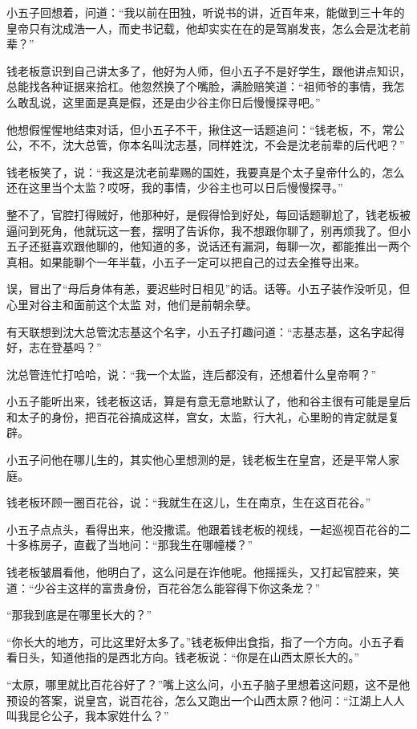 小五子回想着，问道：“我以前在田独，听说书的讲，近百年来，能做到三十年的皇帝只有沈成浩一人，而史书记载，他却实实在在的是驾崩发丧，怎么会是沈老前辈？”

钱老板意识到自己讲太多了，他好为人师，但小五子不是好学生，跟他讲点知识，总能找各种证据来拾杠。他忽然换了个嘴脸，满脸赔笑道：“祖师爷的事情，我怎么敢乱说，这里面是真是假，还是由少谷主你日后慢慢探寻吧。”

他想假惺惺地结束对话，但小五子不干，揪住这一话题追问：“钱老板，不，常公公，不不，沈大总管，你本名叫沈志基，同样姓沈，不会是沈老前辈的后代吧？”

钱老板笑了，说：“我这是沈老前辈赐的国姓，我要真是个太子皇帝什么的，怎么还在这里当个太监？哎呀，我的事情，少谷主也可以日后慢慢探寻。”

整不了，官腔打得贼好，他那种好，是假得恰到好处，每回话题聊尬了，钱老板被逼问到死角，他就玩这一套，摆明了告诉你，我不想跟你聊了，别再烦我了。但小五子还挺喜欢跟他聊的，他知道的多，说话还有漏洞，每聊一次，都能推出一两个真相。如果能聊个一年半载，小五子一定可以把自己的过去全推导出来。

误，冒出了“母后身体有恙，要迟些时日相见”的话。话等。小五子装作没听见，但心里对谷主和面前这个太监
对，他们是前朝余孽。

有天联想到沈大总管沈志基这个名字，小五子打趣问道：“志基志基，这名字起得好，志在登基吗？”

沈总管连忙打哈哈，说：“我一个太监，连后都没有，还想着什么皇帝啊？”

小五子能听出来，钱老板这话，算是有意无意地默认了，他和谷主很有可能是皇后和太子的身份，把百花谷搞成这样，宫女，太监，行大礼，心里盼的肯定就是复辟。

小五子问他在哪儿生的，其实他心里想测的是，钱老板生在皇宫，还是平常人家庭。

钱老板环顾一圈百花谷，说：“我就生在这儿，生在南京，生在这百花谷。”

小五子点点头，看得出来，他没撒谎。他跟着钱老板的视线，一起巡视百花谷的二十多栋房子，直截了当地问：“那我生在哪幢楼？”

钱老板皱眉看他，他明白了，这么问是在诈他呢。他摇摇头，又打起官腔来，笑道：“少谷主这样的富贵身份，百花谷怎么能容得下你这条龙？”

“那我到底是在哪里长大的？”

“你长大的地方，可比这里好太多了。”钱老板伸出食指，指了一个方向。小五子看看日头，知道他指的是西北方向。钱老板说：“你是在山西太原长大的。”

“太原，哪里就比百花谷好了？”嘴上这么问，小五子脑子里想着这问题，这不是他预设的答案，说皇宫，说百花谷，怎么又跑出一个山西太原？他问：“江湖上人人叫我昆仑公子，我本家姓什么？”

